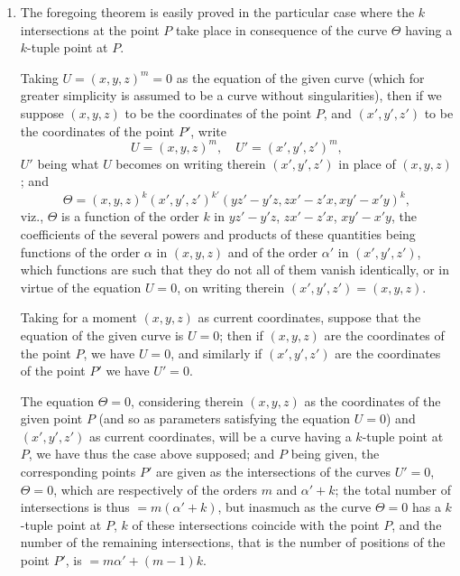 \documentclass[12pt,a4paper]{article}
\theoremstyle{plain}
\theoremstyle{definition}
\theoremstyle{remark}
\begin{document}
\begin{enumerate}[label=\arabic*.]
I find that if the curve $\Theta$ has with the given curve $k$ intersections at the point $P$, then in the system of $(P, P')$, the number of united points is
\[\sigma = \alpha + \alpha' + 2kD,\]
whence in particular, if the curve $\Theta$ does not pass through the point $P$, then the number of united points is $= \alpha + \alpha'$, as in a unicursal curve.

\item[$4^*$.] The foregoing theorem is easily proved in the particular case where the $k$ intersections at the point $P$ take place in consequence of the curve $\Theta$ having a $k$-tuple point at $P$.

Taking $U = (x,y,z)^m = 0$ as the equation of the given curve (which for greater simplicity is assumed to be a curve without singularities), then if we suppose $(x,y,z)$ to be the coordinates of the point $P$, and $(x',y',z')$ to be the coordinates of the point $P'$, write
\[U = (x,y,z)^m, \quad U' = (x',y',z')^m,\]
$U'$ being what $U$ becomes on writing therein $(x',y',z')$ in place of $(x,y,z)$; and
\[\Theta = (x,y,z)^k (x',y',z')^{k'} (yz' - y'z, zx' - z'x, xy' - x'y)^k,\]
viz., $\Theta$ is a function of the order $k$ in $yz' - y'z$, $zx' - z'x$, $xy' - x'y$, the coefficients of the several powers and products of these quantities being functions of the order $\alpha$ in $(x,y,z)$ and of the order $\alpha'$ in $(x',y',z')$, which functions are such that they do not all of them vanish identically, or in virtue of the equation $U = 0$, on writing therein $(x',y',z') = (x,y,z)$.

Taking for a moment $(x,y,z)$ as current coordinates, suppose that the equation of the given curve is $U = 0$; then if $(x,y,z)$ are the coordinates of the point $P$, we have $U = 0$, and similarly if $(x',y',z')$ are the coordinates of the point $P'$ we have $U' = 0$.

The equation $\Theta = 0$, considering therein $(x,y,z)$ as the coordinates of the given point $P$ (and so as parameters satisfying the equation $U = 0$) and $(x',y',z')$ as current coordinates, will be a curve having a $k$-tuple point at $P$, we have thus the case above supposed; and $P$ being given, the corresponding points $P'$ are given as the intersections of the curves $U' = 0$, $\Theta = 0$, which are respectively of the orders $m$ and $\alpha' + k$; the total number of intersections is thus $= m(\alpha' + k)$, but inasmuch as the curve $\Theta = 0$ has a $k$-tuple point at $P$, $k$ of these intersections coincide with the point $P$, and the number of the remaining intersections, that is the number of positions of the point $P'$, is $= m\alpha' + (m-1)k$.


\end{enumerate}
\end{document}
